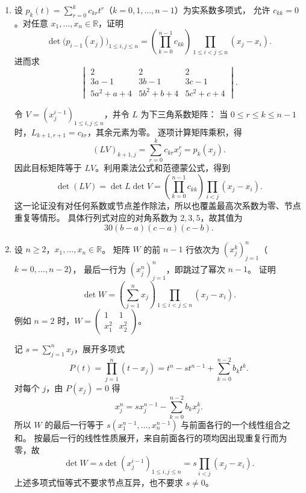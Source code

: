 \documentclass[UTF8,12pt,a4paper,fontset=fandol]{ctexart}
\begin{document}
\begin{enumerate}[label=\arabic*.,resume=detquestions]
\item\label{q:polynomial-basis}
设 $p_k(t)=\sum_{r=0}^{k}c_{kr}t^r$（$k=0,1,\ldots,n-1$）为实系数多项式，
允许 $c_{kk}=0$。对任意 $x_1,\ldots,x_n\in\mathbb R$，证明
\[
\det\bigl(p_{i-1}(x_j)\bigr)_{1\leq i,j\leq n}
=\left(\prod_{k=0}^{n-1}c_{kk}\right)
\prod_{1\leq i<j\leq n}(x_j-x_i).
\]
进而求
\[
\begin{vmatrix}
2&2&2\\
3a-1&3b-1&3c-1\\
5a^2+a+4&5b^2+b+4&5c^2+c+4
\end{vmatrix}.
\]
\begin{solve}
令 $V=(x_j^{i-1})_{1\leq i,j\leq n}$，并令 $L$ 为下三角系数矩阵：
当 $0\leq r\leq k\leq n-1$ 时，$L_{k+1,r+1}=c_{kr}$，其余元素为零。
逐项计算矩阵乘积，得
\[
(LV)_{k+1,j}=\sum_{r=0}^{k}c_{kr}x_j^r=p_k(x_j).
\]
因此目标矩阵等于 $LV$。利用乘法公式和范德蒙公式，得到
\[
\det(LV)=\det L\det V
=\left(\prod_{k=0}^{n-1}c_{kk}\right)
\prod_{i<j}(x_j-x_i).
\]
这一论证没有对任何系数或节点差作除法，所以也覆盖最高次系数为零、节点重复等情形。
具体行列式对应的对角系数为 $2,3,5$，故其值为
\[
\boxed{30(b-a)(c-a)(c-b).}
\]
\end{solve}

\item\label{q:missing-power}
设 $n\geq2$，$x_1,\ldots,x_n\in\mathbb R$。
矩阵 $W$ 的前 $n-1$ 行依次为 $(x_j^k)_{j=1}^n$（$k=0,\ldots,n-2$），
最后一行为 $(x_j^n)_{j=1}^n$，即跳过了幂次 $n-1$。
证明
\[
\det W=\left(\sum_{j=1}^n x_j\right)
\prod_{1\leq i<j\leq n}(x_j-x_i).
\]
例如 $n=2$ 时，$W=\begin{pmatrix}1&1\\x_1^2&x_2^2\end{pmatrix}$。
\begin{solve}
记 $s=\sum_{j=1}^n x_j$，展开多项式
\[
P(t)=\prod_{j=1}^n(t-x_j)
=t^n-st^{n-1}+\sum_{k=0}^{n-2}b_kt^k.
\]
对每个 $j$，由 $P(x_j)=0$ 得
\[
x_j^n=sx_j^{n-1}-\sum_{k=0}^{n-2}b_kx_j^k.
\]
所以 $W$ 的最后一行等于 $s(x_1^{n-1},\ldots,x_n^{n-1})$
与前面各行的一个线性组合之和。
按最后一行的线性性质展开，来自前面各行的项均因出现重复行而为零，故
\[
\det W=s\det(x_j^{i-1})_{1\leq i,j\leq n}
=s\prod_{i<j}(x_j-x_i).
\]
上述多项式恒等式不要求节点互异，也不要求 $s\ne0$。
\end{solve}


\end{enumerate}
\end{document}
